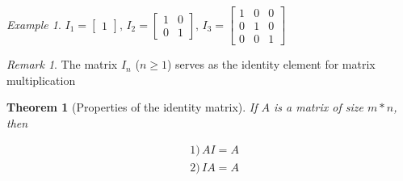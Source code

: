 \documentclass{jhwhw}
\newtheorem{theorem}{Theorem}
\theoremstyle{definition}
\theoremstyle{remark}
\newtheorem*{remark}{Remark}
\theoremstyle{example}
\newtheorem*{example}{Example}
\begin{document}
\begin{example}
\(I_1 = \begin{bmatrix} 1 \end{bmatrix}, \, I_2 = \begin{bmatrix} 1 & 0 \\ 0 & 1 \end{bmatrix}, \, I_3 = \begin{bmatrix} 1 & 0 & 0 \\ 0 & 1 & 0 \\ 0 & 0 & 1 \end{bmatrix}\)    
\end{example}
\begin{remark} The matrix \(I_n\) (\(n \geq 1\)) serves as the identity element for matrix multiplication \end{remark}

\begin{theorem}[Properties of the identity matrix] If \(A\) is a matrix of size \(m*n\), then \end{theorem}
\begin{align*} & 1) \, AI = A\\
& 2) \, IA = A
\end{align*}
\end{document}
